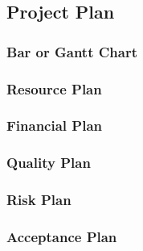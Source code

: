\documentclass[a4paper,12pt]{article}
\begin{document}
\subsection{Project Plan}

\subsubsection{Bar or Gantt Chart}

\subsubsection{Resource Plan}

\subsubsection{Financial Plan}

\subsubsection{Quality Plan}

\subsubsection{Risk Plan}

\subsubsection{Acceptance Plan}
\end{document}
